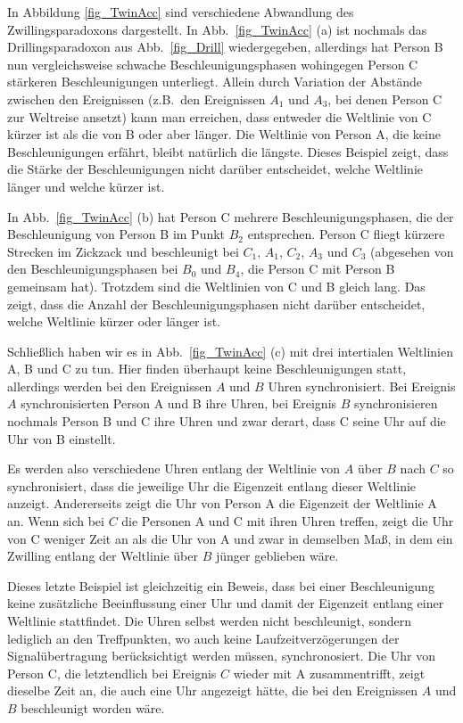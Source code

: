 In Abbildung \ref{fig_TwinAcc} sind verschiedene Abwandlung des Zwillingsparadoxons dargestellt.
In Abb.\ \ref{fig_TwinAcc} (a) ist nochmals das Drillingsparadoxon aus Abb.\ \ref{fig_Drill} wiedergegeben,
allerdings hat Person B nun vergleichsweise schwache Beschleunigungsphasen wohingegen
Person C st\"arkeren Beschleunigungen unterliegt. Allein durch Variation der Abst\"ande zwischen den
Ereignissen (z.B.\ den Ereignissen $A_1$ und $A_3$, bei denen Person C zur Weltreise ansetzt)
kann man erreichen, dass entweder die Weltlinie von C k\"urzer ist als die von B oder aber l\"anger. 
Die Weltlinie von Person A, die keine Beschleunigungen erf\"ahrt, bleibt nat\"urlich die l\"angste.
Dieses Beispiel zeigt, dass die St\"arke der Beschleunigungen nicht dar\"uber entscheidet, welche
Weltlinie l\"anger und welche k\"urzer ist. 

In Abb.\ \ref{fig_TwinAcc} (b) hat Person C mehrere Beschleunigungsphasen, die der
Beschleunigung von Person B im Punkt $B_2$ entsprechen. Person C fliegt k\"urzere Strecken
im Zickzack und beschleunigt bei $C_1$, $A_1$, $C_2$, $A_3$ und $C_3$ (abgesehen von
den Beschleunigungsphasen bei $B_0$ und $B_4$, die Person C mit Person B gemeinsam hat). 
Trotzdem sind die Weltlinien von C und B gleich lang. Das zeigt, dass die Anzahl der
Beschleunigungsphasen nicht dar\"uber entscheidet, welche Weltlinie k\"urzer oder l\"anger ist. 

Schlie\ss lich haben wir es in Abb.\ \ref{fig_TwinAcc} (c) mit drei intertialen Weltlinien A, B und C
zu tun. Hier finden \"uberhaupt keine Beschleunigungen statt, allerdings werden bei den 
Ereignissen $A$ und $B$ Uhren synchronisiert. Bei Ereignis $A$ synchronisierten Person A und
B ihre Uhren, bei Ereignis $B$ synchronisieren nochmals Person B und C ihre Uhren und zwar
derart, dass C seine Uhr auf die Uhr von B einstellt. 

Es werden also verschiedene Uhren entlang
der Weltlinie von $A$ \"uber $B$ nach $C$ so synchronisiert, dass die jeweilige Uhr die
Eigenzeit entlang dieser Weltlinie anzeigt. Andererseits zeigt die Uhr von Person A die Eigenzeit
der Weltlinie A an. Wenn sich bei $C$ die Personen A und C mit ihren Uhren treffen, zeigt 
die Uhr von C weniger Zeit an als die Uhr von A und zwar in demselben Ma\ss, in dem ein
Zwilling entlang der Weltlinie \"uber $B$ j\"unger geblieben w\"are. 

Dieses letzte Beispiel ist gleichzeitig ein Beweis, dass bei einer Beschleunigung keine
zus\"atzliche Beeinflussung einer Uhr und damit der Eigenzeit entlang einer Weltlinie stattfindet. 
Die Uhren selbst werden nicht beschleunigt, sondern lediglich an den Treffpunkten, wo auch
keine Laufzeitverz\"ogerungen der Signal\"ubertragung ber\"ucksichtigt werden m\"ussen, synchronosiert. 
Die Uhr von Person C, die letztendlich bei Ereignis $C$ wieder mit A zusammentrifft, zeigt
dieselbe Zeit an, die auch eine Uhr angezeigt h\"atte, die bei den Ereignissen $A$ und $B$
beschleunigt worden w\"are. 
 
